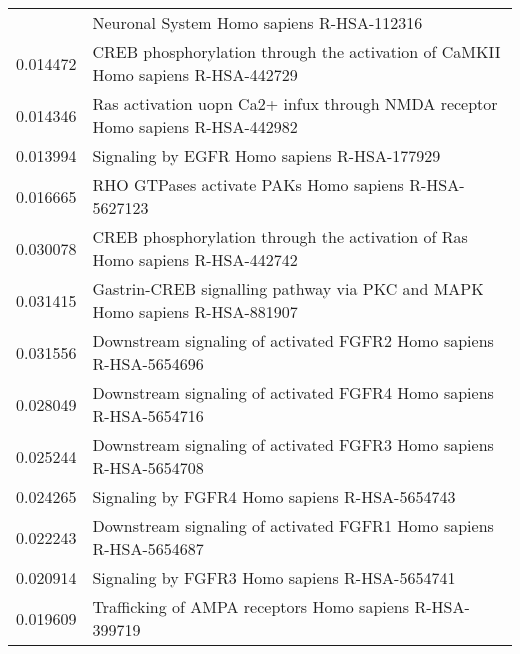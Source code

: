 \begin{longtable}{p{2.4cm}p{14.5cm}}
\bottomrule
\endlastfoot
                 0.017155 &                                                                          Neuronal System Homo sapiens R-HSA-112316 \\
                 0.014472 &                                    CREB phosphorylation through the activation of CaMKII Homo sapiens R-HSA-442729 \\
                 0.014346 &                                     Ras activation uopn Ca2+ infux through NMDA receptor Homo sapiens R-HSA-442982 \\
                 0.013994 &                                                                        Signaling by EGFR Homo sapiens R-HSA-177929 \\
                 0.016665 &                                                               RHO GTPases activate PAKs Homo sapiens R-HSA-5627123 \\
                 0.030078 &                                       CREB phosphorylation through the activation of Ras Homo sapiens R-HSA-442742 \\
                 0.031415 &                                         Gastrin-CREB signalling pathway via PKC and MAPK Homo sapiens R-HSA-881907 \\
                 0.031556 &                                                 Downstream signaling of activated FGFR2 Homo sapiens R-HSA-5654696 \\
                 0.028049 &                                                 Downstream signaling of activated FGFR4 Homo sapiens R-HSA-5654716 \\
                 0.025244 &                                                 Downstream signaling of activated FGFR3 Homo sapiens R-HSA-5654708 \\
                 0.024265 &                                                                      Signaling by FGFR4 Homo sapiens R-HSA-5654743 \\
                 0.022243 &                                                 Downstream signaling of activated FGFR1 Homo sapiens R-HSA-5654687 \\
                 0.020914 &                                                                      Signaling by FGFR3 Homo sapiens R-HSA-5654741 \\
                 0.019609 &                                                            Trafficking of AMPA receptors Homo sapiens R-HSA-399719 \\

\end{longtable}
